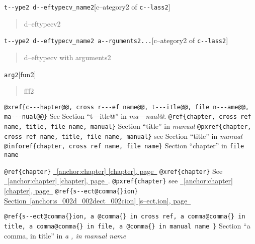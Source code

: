 \documentclass{book}
\begin{document}
\noindent\texttt{t{-}{-}ype2 d{-}{-}eftypecv\_name2}\hfill[c--ategory2 of \texttt{c{-}{-}lass2}]



%
\begin{quote}
d--eftypecv2
\end{quote}

\noindent\texttt{t{-}{-}ype2 d{-}{-}eftypecv\_name2 a{-}{-}rguments2...}\hfill[c--ategory2 of \texttt{c{-}{-}lass2}]



%
\begin{quote}
d--eftypecv with arguments2
\end{quote}

\noindent\texttt{arg2}\hfill[fun2]



%
\begin{quote}
fff2
\end{quote}


\texttt{@xref\{c{-}{-}{-}hapter@@, cross r{-}{-}{-}ef name@@, t{-}{-}{-}itle@@, file n{-}{-}{-}ame@@, ma{-}{-}{-}nual@@\}} See Section ``t---itle@'' in \textsl{ma---nual@}.
\texttt{@ref\{chapter, cross ref name, title, file name, manual\}} Section ``title'' in \textsl{manual}
\texttt{@pxref\{chapter, cross ref name, title, file name, manual\}} see Section ``title'' in \textsl{manual}
\texttt{@inforef\{chapter, cross ref name, file name\}} Section ``chapter'' in \texttt{file name}

\texttt{@ref\{chapter\}} \hyperref[anchor:chapter]{\chaptername~\ref*{anchor:chapter} [chapter], page~\pageref*{anchor:chapter}}
\texttt{@xref\{chapter\}} See \hyperref[anchor:chapter]{\chaptername~\ref*{anchor:chapter} [chapter], page~\pageref*{anchor:chapter}}.
\texttt{@pxref\{chapter\}} see \hyperref[anchor:chapter]{\chaptername~\ref*{anchor:chapter} [chapter], page~\pageref*{anchor:chapter}}
\texttt{@ref\{s{-}{-}ect@comma\{\}ion\}} \hyperref[anchor:s_002d_002dect_002cion]{Section~\ref*{anchor:s_002d_002dect_002cion} [s--ect,ion], page~\pageref*{anchor:s_002d_002dect_002cion}}

\texttt{@ref\{s{-}{-}ect@comma\{\}ion, a @comma\{\} in cross
ref, a comma@comma\{\} in title, a comma@comma\{\} in file, a @comma\{\} in manual name \}}
Section ``a comma, in title'' in \textsl{a , in manual name}
\end{document}
